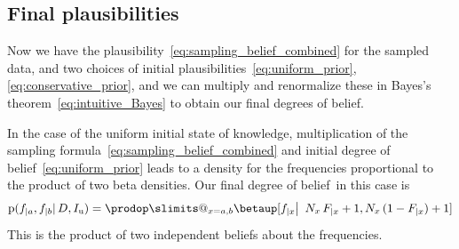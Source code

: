 \documentclass[\ifafour a4paper,12pt,\else a5paper,10pt,\fi%
onecolumn,oneside,article,%
british%
]{memoir}
\makeatletter
\theoremstyle{remark}
\theoremstyle{innote}
\def\prod{\DOTSI\prodop\slimits@}
\newcommand*{\pf}{\mathrm{p}}%
\renewcommand*{\|}{\mathpunct{|}}
\newcommand*{\bigcond}{\mathpunct{\big|\ }}%
\newcommand*{\dob}{degree of belief}
\newcommand*{\dobs}{degrees of belief}
\newcommand*{\yD}{D}
\newcommand*{\yI}{I}
\newcommand*{\yIu}{\yI_\text{u}}
\newcommand*{\ya}{a}
\newcommand*{\yb}{b}
\newcommand*{\dbeta}{\betaup}
\makeatother
\begin{document}
\subsection{Final plausibilities}
\label{sec:p_final}

Now we have the plausibility~\eqref{eq:sampling_belief_combined} for the
sampled data, and two choices of initial
plausibilities~\eqref{eq:uniform_prior}, \eqref{eq:conservative_prior}, and
we can multiply and renormalize these in Bayes's
theorem~\eqref{eq:intuitive_Bayes} to obtain our final \dobs.

In the case of the uniform initial state of knowledge, multiplication of
the sampling formula~\eqref{eq:sampling_belief_combined} and initial
\dob~\eqref{eq:uniform_prior} leads to a density for the frequencies
proportional to the product of two beta densities. Our final \dob\ in this
case is
\begin{equation}
  \label{eq:final_from_uniform}
  \pf(f_{|\ya}, f_{|\yb} \| \yD, \yIu)
  =
\prod_{x=\ya,\yb}
\dbeta[f_{|x} \bigcond N_{x}\,F_{|x}+1, N_{x}\,(1-F_{|x})+1]
\end{equation}
This is the product of two independent beliefs about the frequencies.
\end{document}
